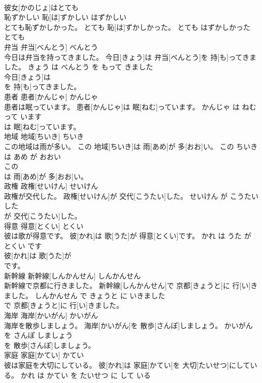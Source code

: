 \documentclass[8pt]{extreport}
\begin{document}
\begin{CJK}{UTF8}{min}
\\	彼女[かのじょ]はとても
\\	恥ずかしい	恥[は]ずかしい	はずかしい	
\\	とても恥ずかしかった。	とても 恥[は]ずかしかった。	とても はずかしかった	
\\	とても
\\	弁当	弁当[べんとう]	べんとう	
\\	今日は弁当を持ってきました。	今日[きょう]は 弁当[べんとう]を 持[も]ってきました。	きょう は べんとう を もって きました	
\\	今日[きょう]は
\\	を 持[も]ってきました。			
\\	患者	患者[かんじゃ]	かんじゃ	
\\	患者は眠っています。	患者[かんじゃ]は 眠[ねむ]っています。	かんじゃ は ねむって います	
\\	は 眠[ねむ]っています。			
\\	地域	地域[ちいき]	ちいき	
\\	この地域は雨が多い。	この 地域[ちいき]は 雨[あめ]が 多[おお]い。	この ちいき は あめ が おおい	
\\	この
\\	は 雨[あめ]が 多[おお]い。			
\\	政権	政権[せいけん]	せいけん	
\\	政権が交代した。	政権[せいけん]が 交代[こうたい]した。	せいけん が こうたい した	
\\	が 交代[こうたい]した。			
\\	得意	得意[とくい]	とくい	
\\	彼は歌が得意です。	彼[かれ]は 歌[うた]が 得意[とくい]です。	かれ は うた が とくい です	
\\	彼[かれ]は 歌[うた]が
\\	です。			
\\	新幹線	新幹線[しんかんせん]	しんかんせん	
\\	新幹線で京都に行きました。	新幹線[しんかんせん]で 京都[きょうと]に 行[い]きました。	しんかんせん で きょうと に いきました	
\\	で 京都[きょうと]に 行[い]きました。			
\\	海岸	海岸[かいがん]	かいがん	
\\	海岸を散歩しましょう。	海岸[かいがん]を 散歩[さんぽ]しましょう。	かいがん を さんぽ しましょう	
\\	を 散歩[さんぽ]しましょう。			
\\	家庭	家庭[かてい]	かてい	
\\	彼は家庭を大切にしている。	彼[かれ]は 家庭[かてい]を 大切[たいせつ]にしている。	かれ は かてい を たいせつ に して いる	

\end{CJK}
\end{document}
